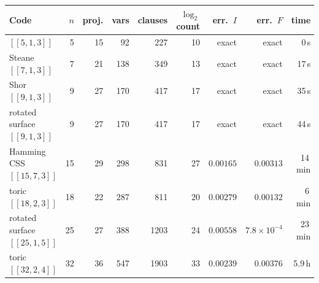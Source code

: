 \begin{tabular}{@{}lrrrrrrrr@{}}
\toprule
Code & $n$ & proj. & vars & clauses & $\log_2$ count & err.\ $I$ & err.\ $F$ & time\\
\midrule
$[[5,1,3]]$ & 5 & 15 & 92 & 227 & 10 & exact & exact & 0\,s\\
Steane $[[7,1,3]]$ & 7 & 21 & 138 & 349 & 13 & exact & exact & 17\,s\\
Shor $[[9,1,3]]$ & 9 & 27 & 170 & 417 & 17 & exact & exact & 35\,s\\
rotated surface $[[9,1,3]]$ & 9 & 27 & 170 & 417 & 17 & exact & exact & 44\,s\\
Hamming CSS $[[15,7,3]]$ & 15 & 29 & 298 & 831 & 27 & $0.00165$ & $0.00313$ & 14\,min\\
toric $[[18,2,3]]$ & 18 & 22 & 287 & 811 & 20 & $0.00279$ & $0.00132$ & 6\,min\\
rotated surface $[[25,1,5]]$ & 25 & 27 & 388 & 1203 & 24 & $0.00558$ & $7.8\times10^{-4}$ & 23\,min\\
toric $[[32,2,4]]$ & 32 & 36 & 547 & 1903 & 33 & $0.00239$ & $0.00376$ & 5.9\,h\\
\bottomrule
\end{tabular}
